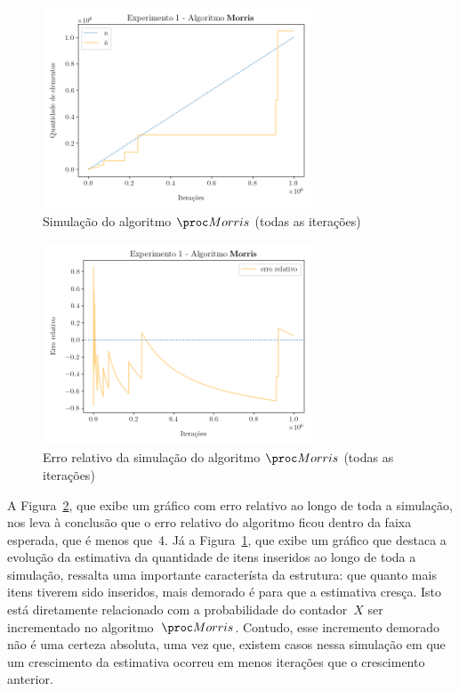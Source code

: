 \begin{figure}[h]
  \centering
  \includegraphics[height=6cm, width=\textwidth]{figuras/morris_full.png}
	\caption{Simulação do algoritmo $\Morris$ (todas as iterações)}
  \label{fig:morris:1000000}
\end{figure}

\begin{figure}[h]
  \centering
  \includegraphics[height=6cm, width=\textwidth]{figuras/morris_erro_full.png}
	\caption{Erro relativo da simulação do algoritmo $\Morris$ (todas as iterações)}
  \label{fig:morris:error:1000000}
\end{figure}

A Figura~\ref{fig:morris:error:1000000}, que exibe um gráfico com erro relativo ao longo de toda a simulação, nos leva
à conclusão que o erro relativo do algoritmo ficou dentro da faixa esperada, que é menos que~4. Já a 
Figura~\ref{fig:morris:1000000}, que exibe um gráfico que destaca a evolução da estimativa da quantidade de itens 
inseridos ao longo de toda a simulação, ressalta uma importante característa da estrutura: que quanto mais itens tiverem
sido inseridos, mais demorado é para que a estimativa cresça. Isto está diretamente relacionado com a probabilidade do 
contador~$X$ ser incrementado no algoritmo~$\Morris$. Contudo, esse incremento demorado não é uma certeza absoluta, uma
vez que, existem casos nessa simulação em que um crescimento da estimativa ocorreu em menos iterações que o 
crescimento anterior. 

